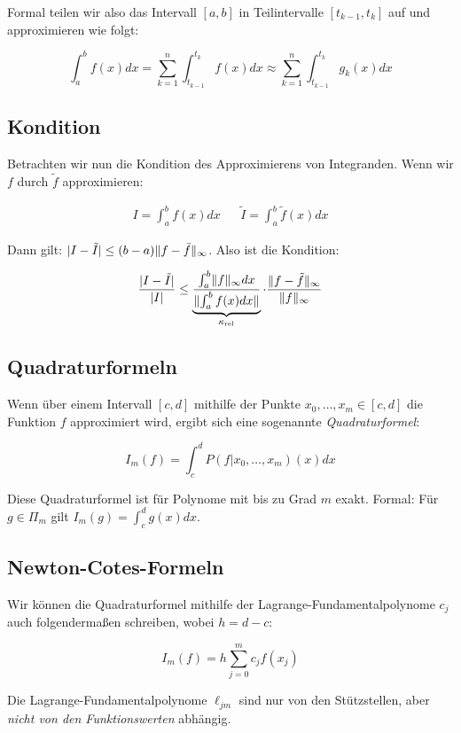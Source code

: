 \documentclass[a4paper,parskip=half*,DIV=15,fontsize=11pt]{scrartcl}
\DeclarePairedDelimiter\abs{\lvert}{\rvert}
\DeclarePairedDelimiter\norm{\lVert}{\rVert}
\begin{document}
Formal teilen wir also das Intervall $[a, b]$ in Teilintervalle $[t_{k-1}, t_k]$ auf und approximieren wie folgt:

\[
	\int_a^b f(x) dx = \sum_{k=1}^n \int_{t_{k-1}}^{t_k} f(x) dx \approx \sum_{k=1}^n \int_{t_{k-1}}^{t_k} g_k(x)dx
\]

\subsection{Kondition}

Betrachten wir nun die Kondition des Approximierens von Integranden. Wenn wir $f$ durch $\tilde{f}$ approximieren:

\begin{align*}
	I = \int_a^b f(x) dx & & \tilde{I} = \int_a^b \tilde{f}(x) dx
\end{align*}

Dann gilt: $\abs{I - \tilde{I}} \leq (b - a) \norm{f - \tilde{f}}_\infty$. Also ist die Kondition:

\[
  \frac{\abs{I - \tilde{I}}}{\abs{I}} \leq \underbrace{\frac{\int_a^b \norm{f}_\infty dx}{\norm{\int_a^b f(x) dx}}}_{\kappa_\mathrm{rel}} \cdot \frac{\norm{f - \tilde{f}}_\infty}{\norm{f}_\infty}
\]

\subsection{Quadraturformeln}

Wenn über einem Intervall $[c, d]$ mithilfe der Punkte $x_0, \ldots, x_m \in [c, d]$ die Funktion $f$ approximiert wird, ergibt sich eine sogenannte \emph{Quadraturformel}:

\[
  I_m(f) = \int_c^d P(f \vert x_0, \ldots, x_m)(x) dx
\]

Diese Quadraturformel ist für Polynome mit bis zu Grad $m$ exakt. Formal: Für $g \in \Pi_m$ gilt $I_m(g) = \int_c^d g(x) dx$.

\subsection{Newton-Cotes-Formeln}

Wir können die Quadraturformel mithilfe der Lagrange-Fundamentalpolynome $c_j$ auch folgendermaßen schreiben, wobei $h = d - c$:

\[
  I_m(f) = h \sum_{j=0}^m c_j f(x_j)
\]

Die Lagrange-Fundamentalpolynome $\ell_{jm}$ sind nur von den Stützstellen, aber \emph{nicht von den Funktionswerten} abhängig.
\end{document}
